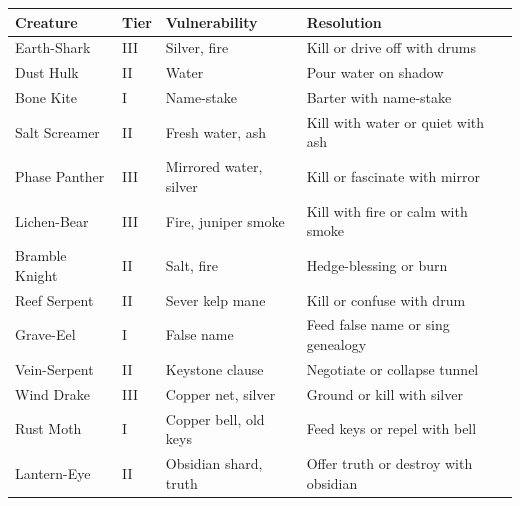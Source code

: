 \begin{tabular}{|l|l|l|l|}
\hline
\textbf{Creature} & \textbf{Tier} & \textbf{Vulnerability} & \textbf{Resolution} \\
\hline
Earth-Shark & III & Silver, fire & Kill or drive off with drums \\
Dust Hulk & II & Water & Pour water on shadow \\
Bone Kite & I & Name-stake & Barter with name-stake \\
Salt Screamer & II & Fresh water, ash & Kill with water or quiet with ash \\
Phase Panther & III & Mirrored water, silver & Kill or fascinate with mirror \\
Lichen-Bear & III & Fire, juniper smoke & Kill with fire or calm with smoke \\
Bramble Knight & II & Salt, fire & Hedge-blessing or burn \\
Reef Serpent & II & Sever kelp mane & Kill or confuse with drum \\
Grave-Eel & I & False name & Feed false name or sing genealogy \\
Vein-Serpent & II & Keystone clause & Negotiate or collapse tunnel \\
Wind Drake & III & Copper net, silver & Ground or kill with silver \\
Rust Moth & I & Copper bell, old keys & Feed keys or repel with bell \\
Lantern-Eye & II & Obsidian shard, truth & Offer truth or destroy with obsidian \\
\hline
\end{tabular}



